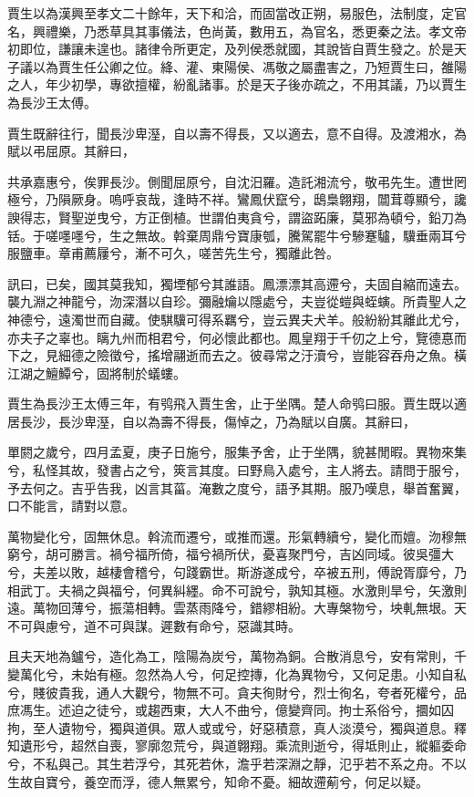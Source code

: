 賈生以為漢興至孝文二十餘年，天下和洽，而固當改正朔，易服色，法制度，定官名，興禮樂，乃悉草具其事儀法，色尚黃，數用五，為官名，悉更秦之法。孝文帝初即位，謙讓未遑也。諸律令所更定，及列侯悉就國，其說皆自賈生發之。於是天子議以為賈生任公卿之位。絳、灌、東陽侯、馮敬之屬盡害之，乃短賈生曰，雒陽之人，年少初學，專欲擅權，紛亂諸事。於是天子後亦疏之，不用其議，乃以賈生為長沙王太傅。

賈生既辭往行，聞長沙卑溼，自以壽不得長，又以適去，意不自得。及渡湘水，為賦以弔屈原。其辭曰，

共承嘉惠兮，俟罪長沙。側聞屈原兮，自沈汨羅。造託湘流兮，敬弔先生。遭世罔極兮，乃隕厥身。嗚呼哀哉，逢時不祥。鸞鳳伏竄兮，鴟梟翺翔，闒茸尊顯兮，讒諛得志，賢聖逆曳兮，方正倒植。世謂伯夷貪兮，謂盜跖廉，莫邪為頓兮，鉛刀為铦。于嗟嚜嚜兮，生之無故。斡棄周鼎兮寶康瓠，騰駕罷牛兮驂蹇驢，驥垂兩耳兮服鹽車。章甫薦屨兮，漸不可久，嗟苦先生兮，獨離此咎。

訊曰，已矣，國其莫我知，獨堙郁兮其誰語。鳳漂漂其高遰兮，夫固自縮而遠去。襲九淵之神龍兮，沕深潛以自珍。彌融爚以隱處兮，夫豈從螘與蛭螾。所貴聖人之神德兮，遠濁世而自藏。使騏驥可得系羈兮，豈云異夫犬羊。般紛紛其離此尤兮，亦夫子之辜也。瞝九州而相君兮，何必懷此都也。鳳皇翔于千仞之上兮，覽德惪而下之，見細德之險徵兮，搖增翮逝而去之。彼尋常之汙瀆兮，豈能容吞舟之魚。橫江湖之鱣鱏兮，固將制於蟻螻。

賈生為長沙王太傅三年，有鸮飛入賈生舍，止于坐隅。楚人命鸮曰服。賈生既以適居長沙，長沙卑溼，自以為壽不得長，傷悼之，乃為賦以自廣。其辭曰，

單閼之歲兮，四月孟夏，庚子日施兮，服集予舍，止于坐隅，貌甚閒暇。異物來集兮，私怪其故，發書占之兮，筴言其度。曰野鳥入處兮，主人將去。請問于服兮，予去何之。吉乎告我，凶言其菑。淹數之度兮，語予其期。服乃嘆息，舉首奮翼，口不能言，請對以意。

萬物變化兮，固無休息。斡流而遷兮，或推而還。形氣轉續兮，變化而嬗。沕穆無窮兮，胡可勝言。禍兮福所倚，福兮禍所伏，憂喜聚門兮，吉凶同域。彼吳彊大兮，夫差以敗，越棲會稽兮，句踐霸世。斯游遂成兮，卒被五刑，傅說胥靡兮，乃相武丁。夫禍之與福兮，何異糾纆。命不可說兮，孰知其極。水激則旱兮，矢激則遠。萬物回薄兮，振蕩相轉。雲蒸雨降兮，錯繆相紛。大專槃物兮，坱軋無垠。天不可與慮兮，道不可與謀。遲數有命兮，惡識其時。

且夫天地為鑪兮，造化為工，陰陽為炭兮，萬物為銅。合散消息兮，安有常則，千變萬化兮，未始有極。忽然為人兮，何足控摶，化為異物兮，又何足患。小知自私兮，賤彼貴我，通人大觀兮，物無不可。貪夫徇財兮，烈士徇名，夸者死權兮，品庶馮生。述迫之徒兮，或趨西東，大人不曲兮，億變齊同。拘士系俗兮，攌如囚拘，至人遺物兮，獨與道俱。眾人或或兮，好惡積意，真人淡漠兮，獨與道息。釋知遺形兮，超然自喪，寥廓忽荒兮，與道翺翔。乘流則逝兮，得坻則止，縱軀委命兮，不私與己。其生若浮兮，其死若休，澹乎若深淵之靜，氾乎若不系之舟。不以生故自寶兮，養空而浮，德人無累兮，知命不憂。細故遰葪兮，何足以疑。

